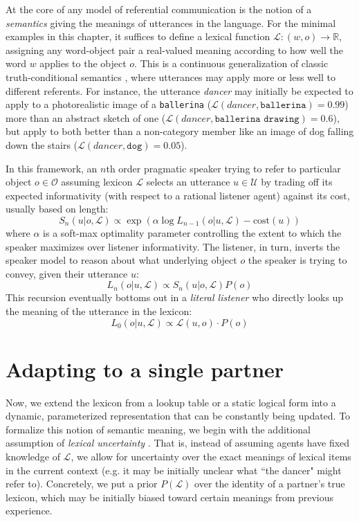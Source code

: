 At the core of any model of referential communication is the notion of a \emph{semantics} giving the meanings of utterances in the language. 
For the minimal examples in this chapter, it suffices to define a lexical function $\mathcal{L}: (w, o) \rightarrow \mathbb{R}$, assigning any word-object pair a real-valued meaning according to how well the word $w$ applies to the object $o$. 
This is a continuous generalization of classic truth-conditional semantics , where utterances may apply more or less well to different referents. 
For instance, the utterance \emph{dancer} may initially be expected to apply to a photorealistic image of a \texttt{ballerina} ($\mathcal{L}(\textit{dancer}, \texttt{ballerina}) = 0.99$) more than an abstract sketch of one ($\mathcal{L}(\textit{dancer}, \texttt{ballerina drawing}) =0.6$), but apply to both better than a non-category member like an image of dog falling down the stairs ($\mathcal{L}(\textit{dancer}, \texttt{dog}) = 0.05$).

In this framework, an $n$th order pragmatic speaker trying to refer to particular object $o \in \mathcal{O}$ assuming lexicon $\mathcal{L}$ selects an utterance $u \in \mathcal{U}$ by trading off its expected informativity (with respect to a rational listener agent) against its cost, usually based on length:
$$S_n(u | o, \mathcal{L}) \propto \exp{\left(\alpha \log L_{n-1}(o | u, \mathcal{L}) - \textrm{cost}(u)\right)}$$
where $\alpha$ is a soft-max optimality parameter controlling the extent to which the speaker maximizes over listener informativity. 
The listener, in turn, inverts the speaker model to reason about what underlying object $o$ the speaker is trying to convey, given their utterance $u$:
$$L_n(o | u, \mathcal{L}) \propto S_{n}(u | o, \mathcal{L})P(o)$$
\indent This recursion eventually bottoms out in a \emph{literal listener} who directly looks up the meaning of the utterance in the lexicon:
$$L_0(o | u, \mathcal{L}) \propto \mathcal{L}(u, o)\cdot P(o)$$

\section{Adapting to a single partner}
Now, we extend the lexicon from a lookup table or a static logical form into a dynamic, parameterized representation that can be constantly being updated.
To formalize this notion of semantic meaning, we begin with the additional assumption of \emph{lexical uncertainty} \cite{SmithGoodmanFrank13_RecursivePragmaticReasoningNIPS,BergenLevyGoodman16_LexicalUncertainty}. 
That is, instead of assuming agents have fixed knowledge of $\mathcal{L}$, we allow for uncertainty over the exact meanings of lexical items in the current context (e.g. it may be initially unclear what ``the dancer" might refer to). 
Concretely, we put a prior $P(\mathcal{L})$ over the identity of a partner's true lexicon, which may be initially biased toward certain meanings from previous experience. 

